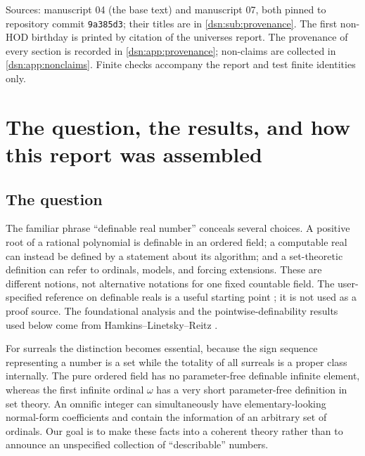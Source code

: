 \documentclass[11pt,a4paper]{article}
\numberwithin{equation}{section}
\theoremstyle{definition}
\theoremstyle{remark}
\newcommand{\HOD}{\mathrm{HOD}}
\begin{document}
\begin{titlepage}
\begin{minipage}{\textwidth}
\begin{abstract}
This report merges two independently written manuscripts, prints shared
results once with both sources named, and keeps every source's
limitations. It is an AI-assisted draft: it has not been refereed, and
nothing in it has been formalized in Lean.
\end{abstract}
\end{minipage}
\vfill
\begin{minipage}{\textwidth}
\footnotesize
Sources: manuscript 04 (the base text) and manuscript 07, both pinned to
repository commit \texttt{9a385d3}; their titles are in
\cref{dsn:sub:provenance}. The first non-$\HOD$ birthday is printed by
citation of the universes report. The provenance of every section is
recorded in \cref{dsn:app:provenance}; non-claims are collected in
\cref{dsn:app:nonclaims}. Finite checks accompany the report and test
finite identities only.
\end{minipage}
\end{titlepage}
\hypersetup{pageanchor=true}
\setcounter{tocdepth}{2}
\begingroup\small\setlength{\parskip}{0pt}
\tableofcontents
\endgroup
\clearpage

\section{The question, the results, and how this report was assembled}
\label{dsn:sec:intro}

\subsection{The question}

The familiar phrase ``definable real number'' conceals several choices.
A positive root of a rational polynomial is definable in an ordered field;
a computable real can instead be defined by a statement about its
algorithm; and a set-theoretic definition can refer to ordinals, models,
and forcing extensions. These are different notions, not alternative
notations for one fixed countable field. The user-specified reference on
definable reals is a useful starting point \cite{WikiDef}; it is not used
as a proof source. The foundational analysis and the
pointwise-definability results used below come from
Hamkins--Linetsky--Reitz \cite{HLR}.

For surreals the distinction becomes essential, because the sign sequence
representing a number is a set while the totality of all surreals is a
proper class internally. The pure ordered field has no parameter-free
definable infinite element, whereas the first infinite ordinal $\omega$
has a very short parameter-free definition in set theory. An omnific
integer can simultaneously have elementary-looking normal-form
coefficients and contain the information of an arbitrary set of ordinals.
Our goal is to make these facts into a coherent theory rather than to
announce an unspecified collection of ``describable'' numbers.
\end{document}
